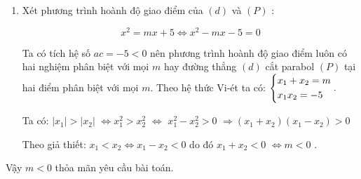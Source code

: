 \begin{ex}
{\begin{enumerate}
\begin{enumerate}
			Thay tọa độ điểm $A(0;5)$ vào phương trình đường thẳng $(d):\ y=mx+5$ ta được:
			$5=m.0+5$ luôn đúng với mọi giá trị của tham số $m$ nên đường thẳng $(d)$ luôn đi qua điểm $A$ với mọi giá trị của $m$.
			
			\item Xét phương trình hoành độ giao điểm của $(d)$ và $(P)$ :
			
			$$x^2=mx+5 \Leftrightarrow 	x^2-mx-5=0$$
			
			
			Ta có tích hệ số $ ac=-5<0 $ nên phương trình hoành độ giao điểm luôn có hai nghiệm phân biệt với mọi $m$ hay đường thẳng $(d)$ cắt parabol $(P)$ tại hai điểm phân biệt với mọi $m$.
			Theo hệ thức Vi-ét ta có: $\left\{\begin{aligned}&x_1+x_2=m\\&x_1x_2=-5\end{aligned}\right..$
		
		Ta có:  $|x_1|>|x_2|$ 
			$\Leftrightarrow  x_1^2>x_2^2$
	 $\Leftrightarrow$ $x_1^2-x_2^2>0$ $\Rightarrow$$ (x_1+x_2)(x_1-x_2)>0$
		
		Theo giả thiết: $x_1<x_2 \Leftrightarrow x_1-x_2<0$ do đó $x_1+x_2<0$ $\Leftrightarrow m<0$ .       
			\end{enumerate}
\end{enumerate} 

Vậy $m<0$ thỏa mãn yêu cầu bài toán.

}
\end{ex}



